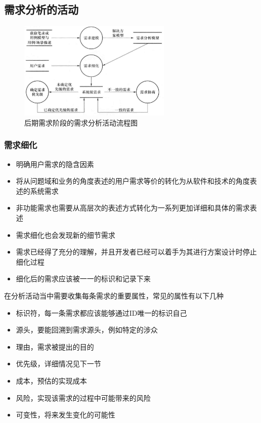 \subsection{需求分析的活动}
\begin{figure}[H]
	\centering
    \vspace{-0.5em}
	\includegraphics[width=0.65\textwidth]{img/后期需求阶段的需求分析活动流程图.png}
    \caption*{后期需求阶段的需求分析活动流程图}
    \vspace{-1em}
\end{figure}

\subsubsection{需求细化}
\begin{itemize}
    \item 明确用户需求的隐含因素 
    \item 将从问题域和业务的角度表述的用户需求等价的转化为从软件和技术的角度表述的系统需求 
    \item 非功能需求也需要从高层次的表述方式转化为一系列更加详细和具体的需求表述 
    \item 需求细化也会发现新的细节需求
    \item 需求已经得了充分的理解，并且开发者已经可以着手为其进行方案设计时停止细化过程 
    \item 细化后的需求应该被一一的标识和记录下来 
\end{itemize}

在分析活动当中需要收集每条需求的重要属性，常见的属性有以下几种
\vspace{-0.8em}
\begin{multicols}{2}
    \begin{itemize}
        \item 标识符，每一条需求都应该能够通过ID唯一的标识自己
        \item 源头，要能回溯到需求源头，例如特定的涉众
        \item 理由，需求被提出的目的
        \item 优先级，详细情况见下一节
        \item 成本，预估的实现成本
        \item 风险，实现该需求的过程中可能带来的风险
        \item 可变性，将来发生变化的可能性
    \end{itemize}
\end{multicols}

